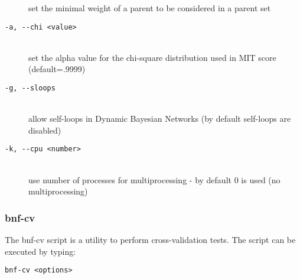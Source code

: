 \begin{description}
 set the minimal weight of a parent to be considered in a parent set %
\item[\texttt{-a, -\hspace{0pt}-chi <value>}]~\\
 set the alpha value for the chi-square distribution used in MIT score (default=.9999)
\item[\texttt{-g, -\hspace{0pt}-sloops}]~\\
 allow self-loops in Dynamic Bayesian Networks (by default self-loops are disabled)
\item[\texttt{-k, -\hspace{0pt}-cpu <number>}]~\\
 use number of processes for multiprocessing - by default 0 is used (no multiprocessing)
\end{description}

\subsubsection{bnf-cv}

The bnf-cv script is a utility to perform cross-validation tests. The script can be executed by typing:
\begin{verbatim}
bnf-cv <options>
\end{verbatim}

